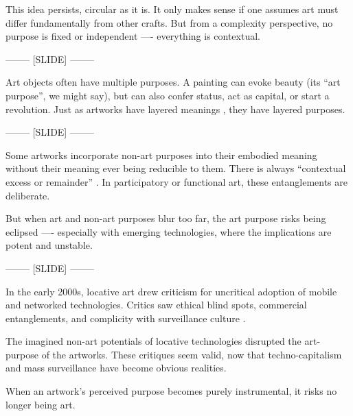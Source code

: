 \documentclass[letter:wpaper]{article}
\begin{document}
    This idea persists, circular as it is. It only makes sense if one assumes art must differ fundamentally from other crafts. But from a complexity perspective, no purpose is fixed or independent —- everything is contextual.

    -------- [SLIDE] --------

    Art objects often have multiple purposes. A painting can evoke beauty (its ``art purpose'', we might say), but can also confer status, act as capital, or start a revolution. Just as artworks have layered meanings \citep[p.4]{DeleuzeNtschAndPhlsphy2006}, they have layered purposes.

    -------- [SLIDE] --------

    Some artworks incorporate non-art purposes into their embodied meaning without their meaning ever being reducible to them. There is always ``contextual excess or remainder'' \citep[p.252]{MassumiPrblsFrThVrtl2002}. In participatory or functional art, these entanglements are deliberate.

    But when art and non-art purposes blur too far, the art purpose risks being eclipsed —- especially with emerging technologies, where the implications are potent and unstable.

    -------- [SLIDE] --------


    In the early 2000s, locative art drew criticism for uncritical adoption of mobile and networked technologies. Critics saw ethical blind spots, commercial entanglements, and complicity with surveillance culture \citep[p.358]{beyondLocativeMedia2006} \citep[para. 2]{questioningTheFrame2004}.

    The imagined non-art potentials of locative technologies disrupted the art-purpose of the artworks. These critiques seem valid, now that techno-capitalism and mass surveillance have become obvious realities.

    When an artwork’s perceived purpose becomes purely instrumental, it risks no longer being art.
\end{document}
